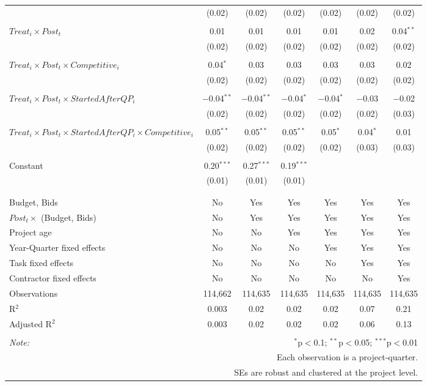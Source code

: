 \documentclass[
]{article}
\begin{document}
\begin{table}[H]
\begin{tabular}{@{\extracolsep{-3pt}}lcccccc}
  & (0.02) & (0.02) & (0.02) & (0.02) & (0.02) & (0.02) \\ 
  & & & & & & \\ 
 $Treat_i \times Post_t$ & 0.01 & 0.01 & 0.01 & 0.01 & 0.02 & 0.04$^{**}$ \\ 
  & (0.02) & (0.02) & (0.02) & (0.02) & (0.02) & (0.02) \\ 
  & & & & & & \\ 
 $Treat_i \times Post_t \times Competitive_i$ & 0.04$^{*}$ & 0.03 & 0.03 & 0.03 & 0.03 & 0.02 \\ 
  & (0.02) & (0.02) & (0.02) & (0.02) & (0.02) & (0.02) \\ 
  & & & & & & \\ 
 $Treat_i \times Post_t \times StartedAfterQP_i$ & $-$0.04$^{**}$ & $-$0.04$^{**}$ & $-$0.04$^{*}$ & $-$0.04$^{*}$ & $-$0.03 & $-$0.02 \\ 
  & (0.02) & (0.02) & (0.02) & (0.02) & (0.02) & (0.03) \\ 
  & & & & & & \\ 
 $Treat_i \times Post_t \times StartedAfterQP_i \times Competitive_i$ & 0.05$^{**}$ & 0.05$^{**}$ & 0.05$^{**}$ & 0.05$^{*}$ & 0.04$^{*}$ & 0.01 \\ 
  & (0.02) & (0.02) & (0.02) & (0.02) & (0.03) & (0.03) \\ 
  & & & & & & \\ 
 Constant & 0.20$^{***}$ & 0.27$^{***}$ & 0.19$^{***}$ &  &  &  \\ 
  & (0.01) & (0.01) & (0.01) &  &  &  \\ 
  & & & & & & \\ 
\hline \\[-1.8ex] 
Budget, Bids & No & Yes & Yes & Yes & Yes & Yes \\ 
$Post_t \times $  (Budget, Bids) & No & Yes & Yes & Yes & Yes & Yes \\ 
Project age & No & No & Yes & Yes & Yes & Yes \\ 
Year-Quarter fixed effects & No & No & No & Yes & Yes & Yes \\ 
Task fixed effects & No & No & No & No & Yes & Yes \\ 
Contractor fixed effects & No & No & No & No & No & Yes \\ 
Observations & 114,662 & 114,635 & 114,635 & 114,635 & 114,635 & 114,635 \\ 
R$^{2}$ & 0.003 & 0.02 & 0.02 & 0.02 & 0.07 & 0.21 \\ 
Adjusted R$^{2}$ & 0.003 & 0.02 & 0.02 & 0.02 & 0.06 & 0.13 \\ 
\hline 
\hline \\[-1.8ex] 
\textit{Note:}  & \multicolumn{6}{r}{$^{*}$p$<$0.1; $^{**}$p$<$0.05; $^{***}$p$<$0.01} \\ 
 & \multicolumn{6}{r}{Each observation is a project-quarter.} \\ 
 & \multicolumn{6}{r}{SEs are robust and clustered at the project level.} \\ 
\end{tabular} 
\end{table}
\end{document}
